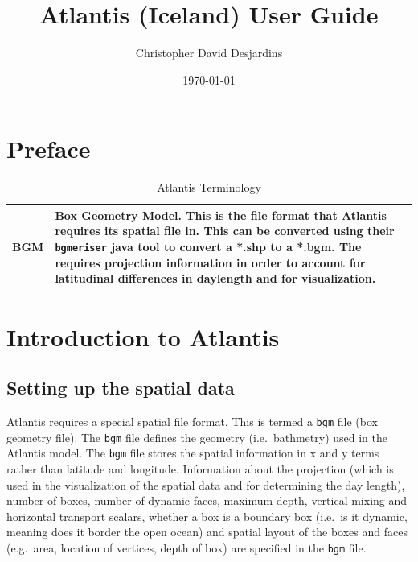 \documentclass{report}
\begin{document}
\title{Atlantis (Iceland) User Guide}
\author{Christopher David Desjardins}
\date{\today}
\maketitle
\newpage

\tableofcontents
\newpage

\chapter{Preface}

\begin{table}[!htbp]
\caption{Atlantis Terminology}
\begin{tabular}{lp{10cm}}
\hline
BGM & Box Geometry Model. This is the file format that Atlantis requires its spatial file in. This can be converted using their \texttt{bgmeriser} java tool to convert a *.shp to a *.bgm. The requires projection information in order to account for latitudinal differences in daylength and for visualization. \\
\hline
\end{tabular}
\end{table}


\chapter{Introduction to Atlantis}

\newpage
\section{Setting up the spatial data}

Atlantis requires a special spatial file format. This is termed a \texttt{bgm} file (box geometry file). The \texttt{bgm} file defines the geometry (i.e.\ bathmetry) used in the Atlantis model. The \texttt{bgm} file stores the spatial information in x and y terms rather than latitude and longitude. Information about the projection (which is used in the visualization of the spatial data and for determining the day length), number of boxes, number of dynamic faces, maximum depth, vertical mixing and horizontal transport scalars, whether a box is a boundary box (i.e.\ is it dynamic, meaning does it border the open ocean) and spatial layout of the boxes and faces (e.g.\ area, location of vertices, depth of box) are specified in the \texttt{bgm} file. 
\end{document}

